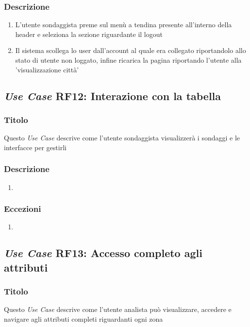         \subsubsection{Descrizione}
            \begin{enumerate}
                \item L'utente sondaggista preme sul menù a tendina presente all'interno della header e seleziona la sezione riguardante il logout
                \item Il sistema scollega lo user dall'account al quale era collegato riportandolo allo stato di utente non loggato, infine 
                ricarica la pagina riportando l'utente alla 'visualizzazione città'
            \end{enumerate}

    \subsection{\textit{Use Case} RF12: Interazione con la tabella}
        \subsubsection{Titolo}
            Questo \textit{Use Case} descrive come l'utente sondaggista visualizzerà i sondaggi e le interfacce per gestirli
        \subsubsection{Descrizione}
            \begin{enumerate}
                \item 
            \end{enumerate}
        \subsubsection{Eccezioni}
            \begin{enumerate}
                \item
            \end{enumerate}

    \subsection{\textit{Use Case} RF13: Accesso completo agli attributi}
        \subsubsection{Titolo}
            Questo \textit{Use Case} descrive come l'utente analista può visualizzare, accedere e navigare agli attributi completi riguardanti ogni zona
